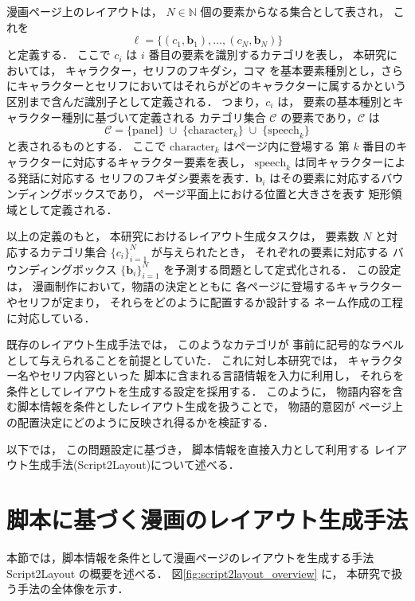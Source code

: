 \documentclass[a4j,12pt,dvipdfmx]{jsreport}
\begin{document}
漫画ページ上のレイアウトは，
$N \in \mathbb{N}$ 個の要素からなる集合として表され，
これを
\begin{equation}
  \ell = \{(c_1, \mathbf{b}_1), \dots, (c_N, \mathbf{b}_N)\}
\end{equation}
と定義する．
ここで $c_i$ は $i$ 番目の要素を識別するカテゴリを表し，
本研究においては，
キャラクター，セリフのフキダシ，コマ
を基本要素種別とし，さらにキャラクターとセリフにおいてはそれらがどのキャラクターに属するかという区別まで含んだ識別子として定義される．
つまり，$c_i$ は，
要素の基本種別とキャラクター種別に基づいて定義される
カテゴリ集合 $\mathcal{C}$ の要素であり，$\mathcal{C}$ は
\begin{equation}
  \mathcal{C}
  =
  \{\text{panel}\}
  \;\cup\;
  \{\text{character}_k\}
  \;\cup\;
  \{\text{speech}_k\}
\end{equation}
と表されるものとする．
ここで $\text{character}_k$ はページ内に登場する
第 $k$ 番目のキャラクターに対応するキャラクター要素を表し，
$\text{speech}_k$ は同キャラクターによる発話に対応する
セリフのフキダシ要素を表す．$\mathbf{b}_i$ はその要素に対応するバウンディングボックスであり，
ページ平面上における位置と大きさを表す
矩形領域として定義される．


以上の定義のもと，
本研究におけるレイアウト生成タスクは，
要素数 $N$ と対応するカテゴリ集合
$\{c_i\}_{i=1}^{N}$ が与えられたとき，
それぞれの要素に対応する
バウンディングボックス
$\{\mathbf{b}_i\}_{i=1}^{N}$ を予測する問題として定式化される．
この設定は，
漫画制作において，物語の決定とともに
各ページに登場するキャラクターやセリフが定まり，
それらをどのように配置するか設計する
ネーム作成の工程に対応している．

既存のレイアウト生成手法では，
このようなカテゴリが
事前に記号的なラベルとして与えられることを前提としていた．
これに対し本研究では，
キャラクター名やセリフ内容といった
脚本に含まれる言語情報を入力に利用し，
それらを条件としてレイアウトを生成する設定を採用する．
このように，
物語内容を含む脚本情報を条件としたレイアウト生成を扱うことで，
物語的意図が
ページ上の配置決定にどのように反映され得るかを検証する．

以下では，
この問題設定に基づき，
脚本情報を直接入力として利用する
レイアウト生成手法(Script2Layout)について述べる．


\section{脚本に基づく漫画のレイアウト生成手法}\label{sec:method}
本節では，脚本情報を条件として漫画ページのレイアウトを生成する手法
Script2Layout の概要を述べる．
図\ref{fig:script2layout_overview} に，
本研究で扱う手法の全体像を示す．
\end{document}

